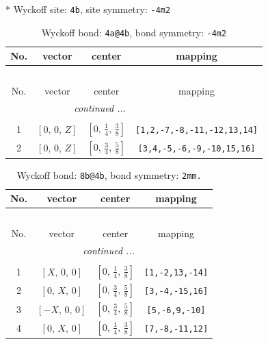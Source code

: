 \documentclass[fleqn,8pt]{jsarticle}
\begin{document}
* Wyckoff site: {\tt 4b}, site symmetry: {\tt -4m2}
\renewcommand{\arraystretch}{1.2}
\begin{longtable}{cccc}
\caption{Wyckoff bond: {\tt 4a@4b}, bond symmetry: {\tt -4m2}}
 \\
 \hline \hline
No. & vector & center & mapping \\ \hline \endfirsthead

\multicolumn{3}{l}{\tablename\ \thetable{}} \\
 \hline \hline
No. & vector & center & mapping \\ \hline \endhead

 \hline \hline
\multicolumn{3}{r}{\footnotesize\it continued ...} \\ \endfoot

 \hline \hline
\multicolumn{3}{r}{} \\ \endlastfoot

1 & $\left[ 0,\, 0,\, Z \right]$ & $\left[ 0,\, \frac{1}{4},\, \frac{3}{8} \right]$ & {\tt [1,2,-7,-8,-11,-12,13,14]} \\ \hline
2 & $\left[ 0,\, 0,\, Z \right]$ & $\left[ 0,\, \frac{3}{4},\, \frac{5}{8} \right]$ & {\tt [3,4,-5,-6,-9,-10,15,16]} \\
\end{longtable}
\renewcommand{\arraystretch}{1.2}
\begin{longtable}{cccc}
\caption{Wyckoff bond: {\tt 8b@4b}, bond symmetry: {\tt 2mm.}}
 \\
 \hline \hline
No. & vector & center & mapping \\ \hline \endfirsthead

\multicolumn{3}{l}{\tablename\ \thetable{}} \\
 \hline \hline
No. & vector & center & mapping \\ \hline \endhead

 \hline \hline
\multicolumn{3}{r}{\footnotesize\it continued ...} \\ \endfoot

 \hline \hline
\multicolumn{3}{r}{} \\ \endlastfoot

1 & $\left[ X,\, 0,\, 0 \right]$ & $\left[ 0,\, \frac{1}{4},\, \frac{3}{8} \right]$ & {\tt [1,-2,13,-14]} \\ \hline
2 & $\left[ 0,\, X,\, 0 \right]$ & $\left[ 0,\, \frac{3}{4},\, \frac{5}{8} \right]$ & {\tt [3,-4,-15,16]} \\ \hline
3 & $\left[ - X,\, 0,\, 0 \right]$ & $\left[ 0,\, \frac{3}{4},\, \frac{5}{8} \right]$ & {\tt [5,-6,9,-10]} \\ \hline
4 & $\left[ 0,\, X,\, 0 \right]$ & $\left[ 0,\, \frac{1}{4},\, \frac{3}{8} \right]$ & {\tt [7,-8,-11,12]} \\
\end{longtable}
\end{document}
